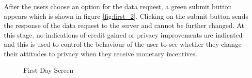 After the users choose an option for the data request, a green submit button appears which is shown in figure \ref{fig:first_2}. Clicking on the submit button sends the response of the data request to the server and cannot be further changed. At this stage, no indications of credit gained or privacy improvements are indicated and this is used to control the behaviour of the user to see whether they change their attitudes to privacy when they receive monetary incentives.

\begin{figure}[htp]
  \hspace{3em}
  \caption{First Day Screen}
  \label{fig:first}
\end{figure}

